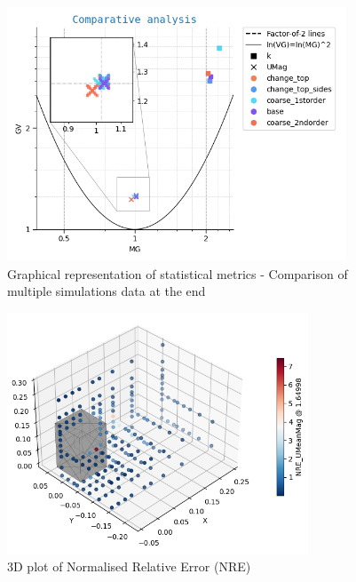\begin{figure}[h!]
    \centering
    \includegraphics[width=0.9\textwidth]{imgs/quantitative_package_multi.png}
    \caption{Graphical representation of statistical metrics - Comparison of multiple
        simulations data at the end}
    \vspace*{-0.5cm}
    \label{example_quantitative} 
\end{figure}

\newpage

\begin{figure}[h!]
    \centering
    \includegraphics[width=0.8\textwidth]{imgs/3dplot_nre_example.png}
    \caption{3D plot of Normalised Relative Error (NRE)}
    \vspace*{-0.5cm}
    \label{example_3dplot}
\end{figure}

